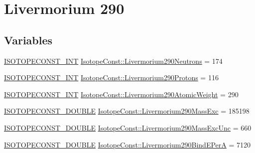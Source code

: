 \hypertarget{group___isotope_const-_livermorium-_lv290}{}\section{Livermorium 290}
\label{group___isotope_const-_livermorium-_lv290}
\subsection*{Variables}
\begin{DoxyCompactItemize}
\item 
\mbox{\hyperlink{group___isotope_const-_macros_ga5f18360b3e99483a35c32d789e62621c}{I\+S\+O\+T\+O\+P\+E\+C\+O\+N\+S\+T\+\_\+\+I\+NT}} \mbox{\hyperlink{group___isotope_const-_livermorium-_lv290_gaf96389d0d0bd368e2d5f5d921d4e063a}{Isotope\+Const\+::\+Livermorium290\+Neutrons}} = 174
\item 
\mbox{\hyperlink{group___isotope_const-_macros_ga5f18360b3e99483a35c32d789e62621c}{I\+S\+O\+T\+O\+P\+E\+C\+O\+N\+S\+T\+\_\+\+I\+NT}} \mbox{\hyperlink{group___isotope_const-_livermorium-_lv290_gaa3b1ca9d9ed4288f37d73a43d2e60243}{Isotope\+Const\+::\+Livermorium290\+Protons}} = 116
\item 
\mbox{\hyperlink{group___isotope_const-_macros_ga5f18360b3e99483a35c32d789e62621c}{I\+S\+O\+T\+O\+P\+E\+C\+O\+N\+S\+T\+\_\+\+I\+NT}} \mbox{\hyperlink{group___isotope_const-_livermorium-_lv290_ga890bbd600bfb6e272e8426019da81415}{Isotope\+Const\+::\+Livermorium290\+Atomic\+Weight}} = 290
\item 
\mbox{\hyperlink{group___isotope_const-_macros_ga8f45a7272ce02c0b4c65c44636ed719a}{I\+S\+O\+T\+O\+P\+E\+C\+O\+N\+S\+T\+\_\+\+D\+O\+U\+B\+LE}} \mbox{\hyperlink{group___isotope_const-_livermorium-_lv290_ga0ffb07f8671369bcf5ec5c55950bcc40}{Isotope\+Const\+::\+Livermorium290\+Mass\+Exc}} = 185198
\item 
\mbox{\hyperlink{group___isotope_const-_macros_ga8f45a7272ce02c0b4c65c44636ed719a}{I\+S\+O\+T\+O\+P\+E\+C\+O\+N\+S\+T\+\_\+\+D\+O\+U\+B\+LE}} \mbox{\hyperlink{group___isotope_const-_livermorium-_lv290_gae6dc422724b9a19713a4f9f06ad6f292}{Isotope\+Const\+::\+Livermorium290\+Mass\+Exc\+Unc}} = 660
\item 
\mbox{\hyperlink{group___isotope_const-_macros_ga8f45a7272ce02c0b4c65c44636ed719a}{I\+S\+O\+T\+O\+P\+E\+C\+O\+N\+S\+T\+\_\+\+D\+O\+U\+B\+LE}} \mbox{\hyperlink{group___isotope_const-_livermorium-_lv290_gae5780458aa6d9a22576776c3cdbdcfd3}{Isotope\+Const\+::\+Livermorium290\+Bind\+E\+PerA}} = 7120

\end{DoxyCompactItemize}
